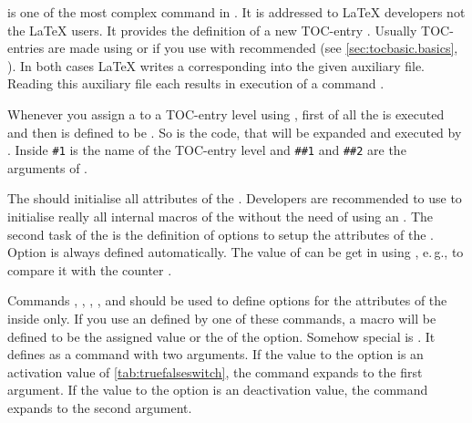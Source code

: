 %
%
%
%
%
%
%
 is
one of the most complex command in \KOMAScript. It is addressed to \LaTeX{}
developers not the \LaTeX{} users. It provides the definition of a new
TOC-entry . Usually TOC-entries are made using
 or if you use
 with recommended
 (see
\autoref{sec:tocbasic.basics},
). In both cases \LaTeX{}
writes a corresponding  into the
given auxiliary file. Reading this auxiliary file each 
results in execution of a command .

Whenever you assign a  to a TOC-entry level using
, first of all the  is
executed and then  is defined to be
. So  is the code, that will be
expanded and executed by . Inside
 \texttt{\#1} is the name of the TOC-entry level and
\texttt{\#\#1} and \texttt{\#\#2} are the arguments of
.

The  should initialise all attributes of the
. Developers are recommended to use  to
initialise really all internal macros of the  without the need of
using an . The second task of the  is
the definition of options to setup the attributes of the . Option
 is always defined automatically. The value of 
can be get in  using
%
, e.\,g., to compare it with
the counter .

Commands ,
, ,
, and 
should be used to define options for the attributes of the
 inside  only. If you use an 
defined by one of these commands, a macro  will be defined to be the assigned value or the
 of the option. Somehow special is
. It defines  as a command with two arguments. If the value to
the option is an activation value of \autoref{tab:truefalseswitch},
 the command expands to the first
argument. If the value to the option is an deactivation value, the command
expands to the second argument.

